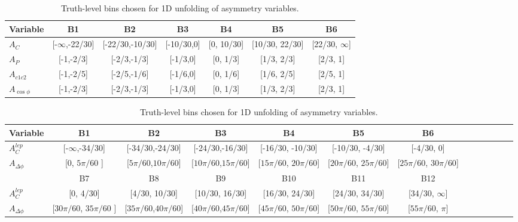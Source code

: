 \begin{table}%
\begin{center}
\caption{Truth-level bins chosen for 1D unfolding of asymmetry variables.}
\label{tab:afb:binning1d}
\begin{tabular}{l |  c  c  c  c  c  c }
\hline
Variable &  B1  &  B2 &  B3 &  B4 &  B5 &  B6\\ \hline
$A_{C}$  &        [-$\infty$,-22/30]  &  [-22/30,-10/30]  &  [-10/30,0]  &  [0, 10/30]  &  [10/30, 22/30]  &  [22/30, $\infty$] \\ \hline
$A_{P}$             &  [-1,-2/3]  &  [-2/3,-1/3]  &  [-1/3,0]  &  [0, 1/3]  &  [1/3, 2/3]  &  [2/3, 1] \\ \hline
$A_{c1c2}$        &  [-1,-2/5]  &  [-2/5,-1/6]  &  [-1/6,0]  &  [0, 1/6]  &  [1/6, 2/5]  &  [2/5, 1] \\ \hline
$A_{\cos\phi}$       &  [-1,-2/3]  &  [-2/3,-1/3]  &  [-1/3,0]  &  [0, 1/3]  &  [1/3, 2/3]  &  [2/3, 1] \\ \hline
\end{tabular}

\bigskip

\begin{tabular}{l |  c  c  c  c  c  c c c c c c c }
\hline
Variable &  B1  &  B2 &  B3 &  B4 &  B5 &  B6 \\ \hline
$A_C^{lep}$  &  [-$\infty$,-34/30]  &  [-34/30,-24/30]  &  [-24/30,-16/30]  &  [-16/30, -10/30]  &  [-10/30, -4/30]  &  [-4/30, 0] \\
\hline
$A_{\Delta\phi}$ &  [0, $5\pi/60$ ]  &  [$5\pi/60$,$10\pi/60$]  &  [$10\pi/60$,$15\pi/60$]  &  [$15\pi/60$, $20\pi/60$]  &  [$20\pi/60$, $25\pi/60$]  &  [$25\pi/60$, $30\pi/60$] \\
\hline \hline
  &  B7 &  B8 &  B9 &  B10 &  B11 &  B12 \\ \hline
$A_C^{lep}$ & [0, 4/30] & [4/30, 10/30] & [10/30, 16/30] & [16/30, 24/30] & [24/30, 34/30] & [34/30, $\infty$] \\ \hline
$A_{\Delta\phi}$ & [$30\pi/60$, $35\pi/60$ ]  &  [$35\pi/60$,$40\pi/60$]  &  [$40\pi/60$,$45\pi/60$]  &  [$45\pi/60$, $50\pi/60$]  &  [$50\pi/60$, $55\pi/60$]  &  [$55\pi/60$, $\pi$] \\ \hline
\end{tabular}
\end{center}
\end{table}

